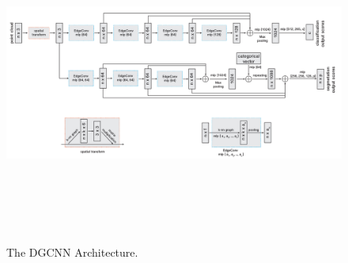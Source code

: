 \begin{figure}[t]
    \centering
    \includegraphics[width=430pt,height=300pt]{pictures/dgcnn_arch.jpg}
    \caption{The \ac{DGCNN} Architecture.\cite{wang2019dynamic}}
    \label{fig:dgcnn_arch}
\end{figure}

\vspace{5mm}

